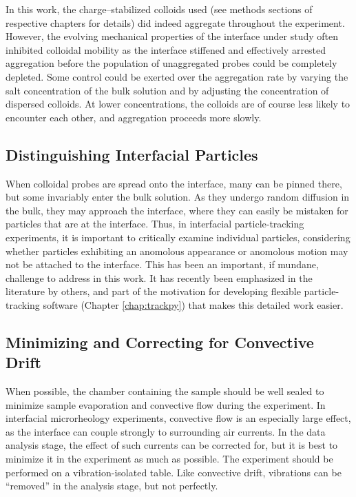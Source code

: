 In this work, the charge--stabilized colloids used (see methods sections of respective chapters for details) did indeed aggregate throughout the experiment. However, the evolving mechanical properties of the interface under study often inhibited colloidal mobility as the interface stiffened and effectively arrested aggregation before the population of unaggregated probes could be completely depleted. Some control could be exerted over the aggregation rate by varying the salt concentration of the bulk solution and by adjusting the concentration of dispersed colloids. At lower concentrations, the colloids are of course less likely to encounter each other, and aggregation proceeds more slowly.

\subsection{Distinguishing Interfacial Particles}

When colloidal probes are spread onto the interface, many can be pinned there, but some invariably enter the bulk solution. As they undergo random diffusion in the bulk, they may approach the interface, where they can easily be mistaken for particles that are at the interface. Thus, in interfacial particle-tracking experiments, it is important to critically examine individual particles, considering whether particles exhibiting an anomolous appearance or anomolous motion may not be attached to the interface. This has been an important, if mundane, challenge to address in this work. It has recently been emphasized in the literature by others\cite{Samaniuk2014}, and part of the motivation for developing flexible particle-tracking software (Chapter \ref{chap:trackpy}) that makes this detailed work easier.

\subsection{Minimizing and Correcting for Convective Drift}

When possible, the chamber containing the sample should be well sealed to minimize sample evaporation and convective flow during the experiment\cite{Savin2005}. In interfacial microrheology experiments, convective flow is an especially large effect, as the interface can couple strongly to surrounding air currents. In the data analysis stage, the effect of such currents can be corrected for\cite{Crocker2007}, but it is best to minimize it in the experiment as much as possible. The experiment should be performed on a vibration-isolated table. Like convective drift, vibrations can be ``removed'' in the analysis stage, but not perfectly.

